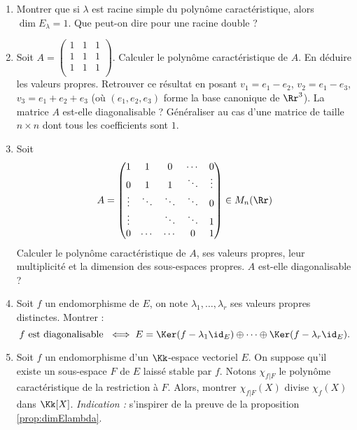 \documentclass[12pt, class=report,crop=false]{standalone}
\begin{document}
\begin{miniexercices}
\sauteligne
\begin{enumerate}
  \item Montrer que si $\lambda$ est racine simple du polynôme caractéristique, alors
  $\dim E_\lambda = 1$. Que peut-on dire pour une racine double ? 
  
  \item Soit $A = \left( \begin{smallmatrix} 1&1&1\\1&1&1\\1&1&1\\\end{smallmatrix}\right)$. Calculer le polynôme caractéristique de $A$. En déduire les valeurs propres.
Retrouver ce résultat en posant $v_1 = e_1-e_2$, $v_2 = e_1-e_3$, $v_3 = e_1+e_2+e_3$ (où $(e_1,e_2,e_3)$ forme la base canonique de $\Rr^3$). La matrice $A$ est-elle diagonalisable ? Généraliser au cas d'une matrice de taille $n\times n$ dont tous les coefficients sont $1$.


  \item 
 
Soit
\[ A = \begin{pmatrix}
1&1&0&\cdots&0\\
0&1&1&\ddots&\vdots\\
\vdots&\ddots&\ddots&\ddots&0\\
\vdots&&\ddots&\ddots&1\\
0&\cdots&\cdots&0&1
\end{pmatrix} \in M_n(\Rr) \]
Calculer le polynôme caractéristique de $A$, ses valeurs propres, leur multiplicité et la dimension des sous-espaces propres.
$A$ est-elle diagonalisable ?

  \item  Soit $f$ un endomorphisme de $E$, on note $\lambda_1,\ldots,\lambda_r$ ses valeurs propres distinctes.
Montrer :
\[f \text{ est diagonalisable } \iff E = \Ker (f -\lambda_1\id_E) \oplus \cdots \oplus \Ker (f-\lambda_r\id_E).\] 

  \item Soit $f$ un endomorphisme d'un $\Kk$-espace vectoriel $E$. On suppose qu'il existe un sous-espace $F$ de $E$ laissé stable par $f$. Notons $\chi_{f | F}$ le polynôme caractéristique de la restriction à $F$. Alors, montrer $\chi_{f | F}(X)$ divise $\chi_f(X)$ dans $\Kk[X]$.
  \emph{Indication :} s'inspirer de la preuve de la proposition \ref{prop:dimElambda}.

\end{enumerate}
\end{miniexercices}







\finchapitre 
\end{document}
